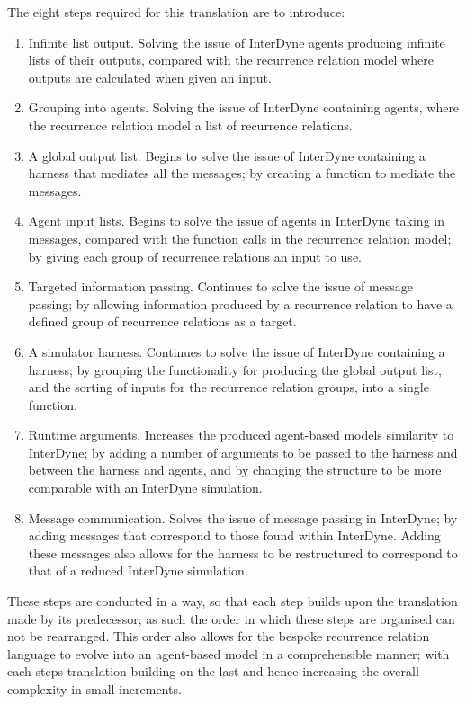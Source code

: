 \documentclass{article}
\begin{document}
The eight steps required for this translation are to introduce:
\begin{enumerate}
  \item Infinite list output. Solving the issue of InterDyne agents producing infinite lists of their outputs, compared with the recurrence relation model where outputs are calculated when given an input.
  \item Grouping into agents. Solving the issue of InterDyne containing agents, where the recurrence relation model a list of recurrence relations.
  \item A global output list. Begins to solve the issue of InterDyne containing a harness that mediates all the messages; by creating a function to mediate the messages.  
  \item Agent input lists. Begins to solve the issue of agents in InterDyne taking in messages, compared with the function calls in the recurrence relation model; by giving each group of recurrence relations an input to use.  
  \item Targeted information passing. Continues to solve the issue of message passing; by allowing information produced by a recurrence relation to have a defined group of recurrence relations as a target. 
  \item A simulator harness. Continues to solve the issue of InterDyne containing a harness; by grouping the functionality for producing the global output list, and the sorting of inputs for the recurrence relation groups, into a single function. 
  \item Runtime arguments. Increases the produced agent-based models similarity to InterDyne; by adding a number of arguments to be passed to the harness and between the harness and agents, and by changing the structure to be more comparable with an InterDyne simulation.
  \item Message communication. Solves the issue of message passing in InterDyne; by adding messages that correspond to those found within InterDyne. Adding these messages also allows for the harness to be restructured to correspond to that of a reduced InterDyne simulation. 
\end{enumerate} 

These steps are conducted in a way, so that each step builds upon the translation made by its predecessor; as such the order in which these steps are organised can not be rearranged. This order also allows for the bespoke recurrence relation language to evolve into an agent-based model in a comprehensible manner; with each steps translation building on the last and hence increasing the overall complexity in small increments.   
\end{document}
